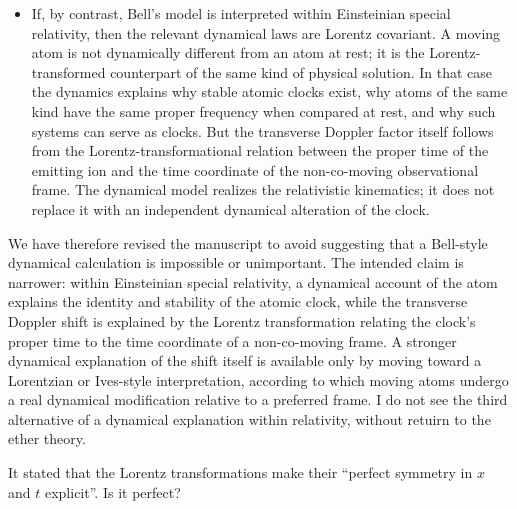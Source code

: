 \documentclass[submitted,11pt]{article}
\begin{document}
\begin{reply}
\begin{itemize}
\item If, by contrast, Bell’s model is interpreted within Einsteinian special relativity, then the relevant dynamical laws are Lorentz covariant. A moving atom is not dynamically different from an atom at rest; it is the Lorentz-transformed counterpart of the same kind of physical solution. In that case the dynamics explains why stable atomic clocks exist, why atoms of the same kind have the same proper frequency when compared at rest, and why such systems can serve as clocks. But the transverse Doppler factor itself follows from the Lorentz-transformational relation between the proper time of the emitting ion and the time coordinate of the non-co-moving observational frame. The dynamical model realizes the relativistic kinematics; it does not replace it with an independent dynamical alteration of the clock.
\end{itemize}
%
%
We have therefore revised the manuscript to avoid suggesting that a Bell-style dynamical calculation is impossible or unimportant. The intended claim is narrower: within Einsteinian special relativity, a dynamical account of the atom explains the identity and stability of the atomic clock, while the transverse Doppler shift is explained by the Lorentz transformation relating the clock’s proper time to the time coordinate of a non-co-moving frame. A stronger dynamical explanation of the shift itself is available only by moving toward a Lorentzian or Ives-style interpretation, according to which moving atoms undergo a real dynamical modification relative to a preferred frame. I do not see the third alternative of a dynamical explanation within relativity, without retuirn to the ether theory.
\end{reply}

\begin{point}
It stated that the Lorentz transformations make their ``perfect symmetry in $x$ and $t$ explicit''. Is it perfect?
\end{point}
\end{document}
